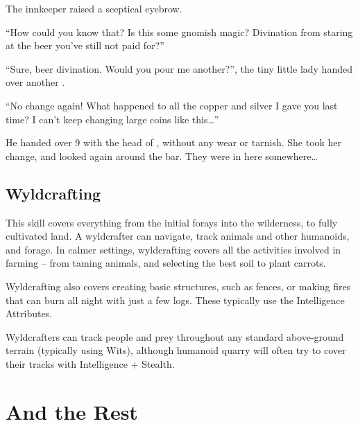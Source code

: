 \begin{multicols}{2}
\begin{exampletext}
  The innkeeper raised a sceptical eyebrow.

  ``How could you know that?
  Is this some gnomish magic?
  Divination from staring at the beer you've still not paid for?''

  ``Sure, beer divination.
  Would you pour me another?'', the tiny little lady handed over another .

  ``No change again!
  What happened to all the copper and silver I gave you last time?
  I can't keep changing large coins like this\ldots''

  He handed over 9  with the head of \iftoggle{aif}{Dalyus Rex}{an ancient king}, without any wear or tarnish.
  She took her change, and looked again around the bar.
  They were in here somewhere\ldots
\end{exampletext}

\subsection{Wyldcrafting}

This skill covers everything from the initial forays into the wilderness, to fully cultivated land.
A wyldcrafter can navigate, track animals and other humanoids, and forage.
In calmer settings, wyldcrafting covers all the activities involved in farming -- from taming animals, and selecting the best soil to plant carrots.

Wyldcrafting also covers creating basic structures, such as fences, or making fires that can burn all night with just a few logs.
These typically use the Intelligence Attributes.

Wyldcrafters can track people and prey throughout any standard above-ground terrain (typically using Wits), although humanoid quarry will often try to cover their tracks with Intelligence + Stealth.

\end{multicols}

\section{And the Rest}

